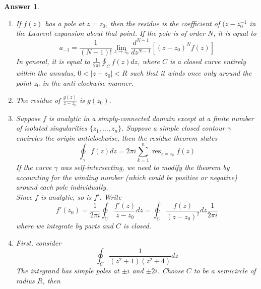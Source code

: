 \documentclass[a4paper]{article}
\DeclareMathOperator{\res}{res}
\newtheorem{ans}{Answer}[section]
\theoremstyle{new}
\begin{document}
\begin{ans}\leavevmode
\begin{enumerate}[label=(\alph*)]
\item If $f(z)$ has a pole at $z=z_0$, then the residue is the coefficient of $(z-z_0^{-1}$ in the Laurent expansion about that point. If the pole is of order $N$, it is equal to
$$a_{-1}=\frac{1}{(N-1)!}\lim_{z\rightarrow z_0}\frac{d^{N-1}}{dz^{N-1}}[(z-z_0)^Nf(z)]$$
In general, it is equal to $\frac{1}{2\pi i}\oint_Cf(z)dz$, where $C$ is a closed curve entirely within the annulus, $0<|z-z_0|<R$ such that it winds once only around the point $z_0$ in the anti-clockwise manner.
\item The residue of $\frac{g(z)}{z-z_0}$ is $g(z_0)$.
\item Suppose $f$ is analytic in a simply-connected domain except at a finite number of isolated singularities $\{z_1,\dots,z_n\}$. Suppose a simple closed contour $\gamma$ encircles the origin anticlockwise, then the residue theorem states
$$\oint_\gamma f(z)dz=2\pi i\sum_{k=1}^n\res_{z=z_k}f(z)$$
If the curve $\gamma$ was self-intersecting, we need to modify the theorem by accounting for the winding number (which could be positive or negative) around each pole individually.\\[5pt]
Since $f$ is analytic, so is $f'$. Write
$$f'(z_0)=\frac{1}{2\pi i}\oint_C\frac{f'(z)}{z-z_0}dz=\oint_C\frac{f(z)}{(z-z_0)^2}dz\frac{1}{2\pi i}$$ 
where we integrate by parts and $C$ is closed.
\item First, consider
$$\oint_C\frac{1}{(z^2+1)(z^2+4)}dz$$
The integrand has simple poles at $\pm i$ and $\pm 2i$. Choose $C$ to be a semicircle of radius $R$, then
\begin{center}
\end{center}
\end{enumerate}
\end{ans}
\end{document}
